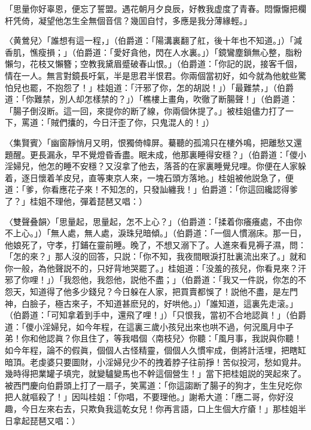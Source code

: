 \begin{myquote}
「思量你好辜恩，便忘了誓盟。遇花朝月夕良辰，好教我虚度了青春。悶懨懨把欄杆凭倚，凝望他怎生全無個音信？幾囬自忖，多應是我分薄緣輕。」

{\markfont〈黄鶯兒〉}「誰想有這一程，」{\marktext（伯爵道：「陽溝裏翻了舡，後十年也不知道。」）}「減香肌，憔瘦損；」{\marktext（伯爵道：「愛好貪他，閃在人水裏。」）}「鏡鸞塵鎖無心整，脂粉懶匀，花枝又懶簪；空教我黛眉蹙破春山恨。」{\marktext（伯爵道：「你記的説，接客千個，情在一人。無言對鏡長吁氣，半是思君半恨君。你兩個當初好，如今就為他躭些驚怕兒也罷，不抱怨了！」桂姐道：「汗邪了你，怎的胡説！」）}「最難禁，」{\marktext（伯爵道：「你難禁，別人却怎樣禁的？」）}「樵樓上畫角，吹徹了断腸聲！」{\marktext（伯爵道：「腸子倒沒断。這一回，來提你的断了線，你兩個休提了。」被桂姐儘力打了一下，罵道：「賊們攮的，今日汗歪了你，只鬼混人的！」）}

{\markfont〈集賢賓〉}「幽窗靜悄月又明，恨獨倚幃屏。驀聽的孤鴻只在樓外鳴，把離愁又還題醒。更長漏永，早不覺燈昏香盡。眠未成，他那裏睡得安穩？」{\marktext（伯爵道：「儍小淫婦兒，他怎的睡不安穩？又沒拿了他去，落荅的在家裏睡覺兒哩。你便在人家躲着，逐日懷着羊皮兒，直等東京人來，一塊石頭方落地。」桂姐被他説急了，便道：「爹，你看應花子來！不知怎的，只發訕纏我！」伯爵道：「你這回纔認得爹了？」桂姐不理他，彈着琵琶又唱：）}

{\markfont〈雙聲叠韻〉}「思量起，思量起，怎不上心？」{\marktext（伯爵道：「揉着你癢癢處，不由你不上心。」）}「無人處，無人處，淚珠兒暗傾。」{\marktext（伯爵道：「一個人慣溺床。那一日，他娘死了，守孝，打鋪在靈前睡。晚了，不想又溺下了。人進來看見褥子濕，問：「怎的來？」那人沒的回答，只説：「你不知，我夜間眼淚打肚裏流出來了。」就和你一般，為他聲説不的，只好背地哭罷了。」桂姐道：「没羞的孩兒，你看見來？汗邪了你哩！」）}「我怨他，我怨他，説他不盡；」{\marktext（伯爵道：「我又一件説，你怎的不怨天，知道得了他多少錢兒？今日躲在人家，把買賣都悞了！説他不盡，是左門神，白臉子，極古來子，不知道甚麽兒的，好哄他。」）}「誰知道，這裏先走滚。」{\marktext（伯爵道：「可知拿着到手中，還飛了哩！」）}「只恨我，當初不合地認眞！」{\marktext（伯爵道：「儍小淫婦兒，如今年程，在這裏三歲小孩兒出來也哄不過，何況風月中子弟！你和他認眞？你且住了，等我唱個〈南枝兒〉你聽：「風月事，我説與你聽！如今年程，論不的假眞，個個人古怪精靈，個個人久慣牢成，倒將計活埋，把瞎缸暗頂。老虔婆只要圖財，小淫婦兒少不的拽着脖子往前掙！苦似投河，愁如覓井。幾時得把業罐子填完，就變驢變馬也不幹這個營生！」當下把桂姐説的哭起來了。被西門慶向伯爵頭上打了一扇子，笑罵道：「你這謅断了腸子的狗才，生生兒吃你把人就嘔殺了！」因叫桂姐：「你唱，不要理他。」謝希大道：「應二哥，你好沒趣，今日左來右去，只欺負我這乾女兒！你再言語，口上生個大疔瘡！」那桂姐半日拿起琵琶又唱：）}


\end{myquote}
